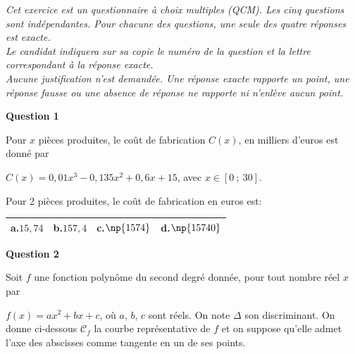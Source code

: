 \bigskip

\emph{Cet exercice est un questionnaire à choix multiples (QCM). Les cinq questions sont indépendantes. Pour chacune des questions, une seule des quatre réponses est exacte.\\
Le candidat indiquera sur sa copie le numéro de la question et la lettre correspondant à la réponse exacte.\\
Aucune justification n'est demandée. Une réponse exacte rapporte un point, une réponse fausse ou une absence de réponse ne rapporte ni n'enlève aucun point.}

\bigskip

\textbf{Question 1}

\medskip

Pour $x$ pièces produites, le coût de fabrication $C(x)$, en milliers d'euros est donné par

$C(x)= 0,01x^3 - 0,135x^2 + 0,6x +15$, avec $x\in [0~;~30]$.

Pour 2 pièces produites, le coût de fabrication en euros est:

\medskip

{\renewcommand{\arraystretch}{1.5}
\begin{tabularx}{\linewidth}{|X|X|X|X|}
\hline
\textbf{a.}\quad $15,74$ &  \textbf{b.}\quad $157,4$ &  \textbf{c.}\quad $\np{1574}$ &  \textbf{d.}\quad $\np{15740}$\\
\hline
\end{tabularx}}

\bigskip

\textbf{Question 2}

\medskip

Soit $f$ une fonction polynôme du second degré donnée, pour tout nombre réel $x$ par

$f(x)= ax^2+bx+c$, où $a$, $b$, $c$ sont réels. On note $\Delta$ son discriminant. On donne ci-dessous $\mathcal{C}_f$ la courbe représentative de $f$ et on suppose qu'elle admet l'axe des abscisses comme tangente en un de ses points.

\begin{center}
\end{center}

